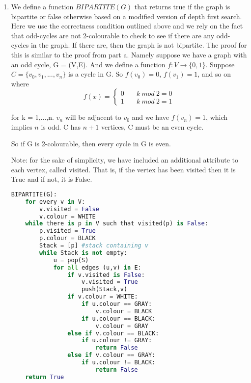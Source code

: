 \documentclass{article}
\begin{document}
\begin{enumerate}[label=(\alph*)]
\item We define a function $BIPARTITE(G)$ that returns true if the graph is bipartite or false otherwise based on a modified version of depth first search. Here we use the correctness condition outlined above and we rely on the fact that odd-cycles are not 2-colourable to check to see if there are any odd-cycles in the graph. If there are, then the graph is not bipartite. The proof for this is similar to the proof from part a. Namely suppose we have a graph with an odd cycle, G = (V,E). And we define a function $f:V \rightarrow \{0,1\}$. Suppose $C = \{v_0, v_1, ..., v_n\}$ is a cycle in G. So $f(v_0) = 0$, $f(v_1) = 1$, and so on where
$$
f(x) = \left\{
        \begin{array}{ll}
            0 & \quad k\ mod\ 2 = 0 \\
            1 & \quad k\ mod\ 2 = 1
        \end{array}
    \right.
$$

for k = 1,...,n. $v_n$ will be adjacent to $v_0$ and we have $f(v_n) = 1$, which implies $n$ is odd. C has $n+1$ vertices, C must be an even cycle.

So if G is 2-colourable, then every cycle in G is even.

Note: for the sake of simplicity, we have included an additional attribute to each vertex, called visited. That is, if the vertex has been visited then it is True and if not, it is False.

\begin{lstlisting}[language=Python]
BIPARTITE(G):
    for every v in V:
        v.visited = False
        v.colour = WHITE
    while there is p in V such that visited(p) is False:
        p.visited = True
        p.colour = BLACK
        Stack = [p] #stack containing v
        while Stack is not empty:
            u = pop(S)
            for all edges (u,v) in E:
                if v.visited is False:
                    v.visited = True
                    push(Stack,v)
                if v.colour = WHITE:
                    if u.colour == GRAY:
                        v.colour = BLACK
                    if u.colour == BLACK:
                        v.colour = GRAY
                else if v.colour == BLACK:
                    if u.colour != GRAY:
                        return False
                else if v.colour == GRAY:
                    if u.colour != BLACK:
                        return False
    return True
    
\end{lstlisting}


\end{enumerate}
\end{document}
